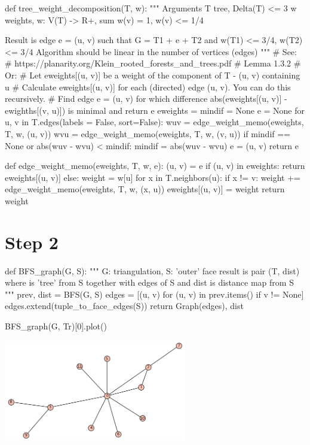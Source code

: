 \begin{sageCell}
def tree_weight_decomposition(T, w):
    """
    Arguments
    T tree, Delta(T) <= 3
    w weights, w: V(T) -> R+, sum w(v) = 1, w(v) <= 1/4

    Result is edge e = (u, v) such that G = T1 + e + T2 and
    w(T1) <= 3/4, w(T2) <= 3/4
    Algorithm should be linear in the number of vertices (edges)
    """
    # See:
    # https://planarity.org/Klein_rooted_forests_and_trees.pdf
    # Lemma 1.3.2
    # Or:
    # Let eweights[(u, v)] be a weight of the component of T - (u, v) containing u
    # Calculate eweights[(u, v)] for each (directed) edge (u, v). You can do this recursively.
    # Find edge e = (u, v) for which difference abs(eweights[(u, v)] - ewighths[(v, u)]) is minimal and return e
    eweights = {}
    mindif = None
    e = None
    for u, v in T.edges(labels = False, sort=False):
        wuv = edge_weight_memo(eweights, T, w, (u, v))
        wvu = edge_weight_memo(eweights, T, w, (v, u))
        if mindif == None or abs(wuv - wvu) < mindif:
            mindif = abs(wuv - wvu)
            e = (u, v)
    return e

def edge_weight_memo(eweights, T, w, e):
    (u, v) = e
    if (u, v) in eweights:
        return eweights[(u, v)]
    else:
        weight = w[u]
        for x in T.neighbors(u):
            if x != v:
                weight += edge_weight_memo(eweights, T, w, (x, u))
        eweights[(u, v)] = weight
        return weight
\end{sageCell}

\section*{Step 2}

\begin{sageCell}
def BFS_graph(G, S):
    """
    G: triangulation,
    S: 'outer' face
    result is pair (T, dist) where is 'tree' from S together with edges of S
    and dist is distance map from S
    """
    prev, dist = BFS(G, S)
    edges = [(u, v) for (u, v) in prev.items() if v != None]
    edges.extend(tuple_to_face_edges(S))
    return Graph(edges), dist
\end{sageCell}

\begin{sageCell}
    BFS_graph(G, Tr)[0].plot()
\end{sageCell}

\begin{outImage}
   \includegraphics[width=0.6\textwidth]{Images/BalancedSeparators/bfs_tree.png}
\end{outImage}

